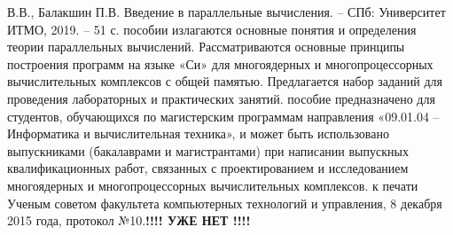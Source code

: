 { %
	\Large{} В.В., Балакшин П.В. Введение в параллельные вычисления. – СПб: Университет ИТМО, 2019. – 51 с.
	\newline
	\newline
	 пособии излагаются основные понятия и определения теории параллельных вычислений. Рассматриваются основные принципы построения программ на языке «Си» для многоядерных и многопроцессорных вычислительных комплексов с общей памятью. Предлагается набор заданий для проведения лабораторных и практических занятий.
	\newline
	\newline
	 пособие предназначено для студентов, обучающихся по магистерским программам направления «09.01.04 – Информатика и вычислительная техника», и может быть использовано выпускниками (бакалаврами и магистрантами) при написании выпускных квалификационных работ, связанных с проектированием и исследованием многоядерных и многопроцессорных вычислительных комплексов.
	\newline
	\newline
	 к печати Ученым советом факультета компьютерных технологий и управления, 8 декабря 2015 года, протокол №10.\textbf{!!!! УЖЕ НЕТ !!!!}
}